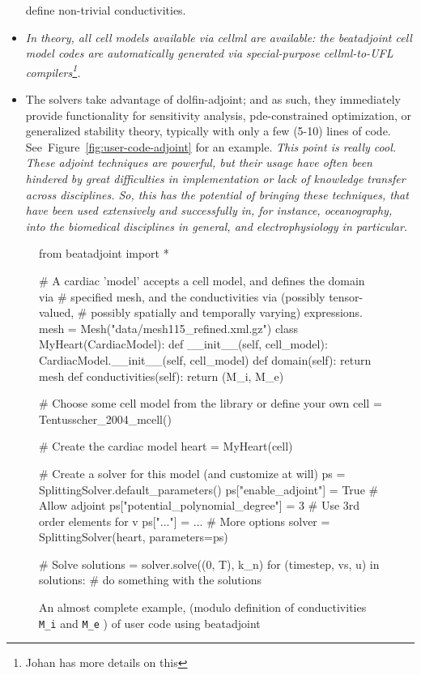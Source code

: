 \documentclass[a4paper, reqno]{amsart}
\numberwithin{equation}{section}
\begin{document}
\begin{itemize}
  define non-trivial conductivities.
\item
  \emph{In theory, all cell models available via cellml are available:
    the beatadjoint cell model codes are automatically generated via
    special-purpose cellml-to-UFL compilers\footnote{Johan has more
      details on this}.}
\item
  The solvers take advantage of dolfin-adjoint; and as such, they
  immediately provide functionality for sensitivity analysis,
  pde-constrained optimization, or generalized stability theory,
  typically with only a few (5-10) lines of
  code. See~Figure~\ref{fig:user-code-adjoint} for an
  example. \emph{This point is really cool. These adjoint techniques
    are powerful, but their usage have often been hindered by great
    difficulties in implementation or lack of knowledge transfer
    across disciplines. So, this has the potential of bringing these
    techniques, that have been used extensively and successfully in,
    for instance, oceanography, into the biomedical disciplines in
    general, and electrophysiology in particular.}

\end{itemize}

\begin{figure}
  \begin{python}
from beatadjoint import *

# A cardiac 'model' accepts a cell model, and defines the domain via
# specified mesh, and the conductivities via (possibly tensor-valued,
# possibly spatially and temporally varying) expressions.
mesh = Mesh("data/mesh115_refined.xml.gz")
class MyHeart(CardiacModel):
    def __init__(self, cell_model):
        CardiacModel.__init__(self, cell_model)
    def domain(self):
        return mesh
    def conductivities(self):
        return (M_i, M_e)

# Choose some cell model from the library or define your own
cell = Tentusscher_2004_mcell()

# Create the cardiac model
heart = MyHeart(cell)

# Create a solver for this model (and customize at will)
ps = SplittingSolver.default_parameters()
ps["enable_adjoint"] = True           # Allow adjoint
ps["potential_polynomial_degree"] = 3 # Use 3rd order elements for v
ps["..."] = ...                       # More options
solver = SplittingSolver(heart, parameters=ps)

# Solve
solutions = solver.solve((0, T), k_n)
for (timestep, vs, u) in solutions:
    # do something with the solutions


  \end{python}
\caption{An almost complete example, (modulo definition of
  conductivities \texttt{M\_i} and \texttt{M\_e} ) of user code using
  beatadjoint}
\label{fig:user-code-beatadjoint}
\end{figure}
\end{document}
